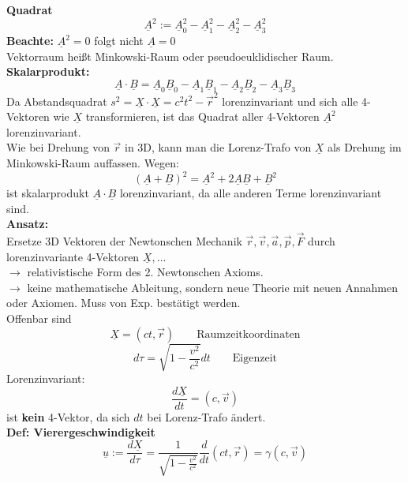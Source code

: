 \documentclass[titlepage,12pt,a4paper,ngerman]{report}
\newcommand{\tx}[1]{\textrm{#1}}
\begin{document}
\textbf{Quadrat}
$$\underline{A}^2 := \underline{A}_0^2 - \underline{A}_1^2 - \underline{A}_2^2 - \underline{A}_3^2$$
\textbf{Beachte:} $ \underline{A}^2 = 0 $ folgt nicht $ \underline{A} = 0 $\\[5pt]
Vektorraum heißt Minkowski-Raum oder pseudoeuklidischer Raum.\\[5pt]
\textbf{Skalarprodukt:}
$$\underline{A} \cdot \underline{B} = \underline{A}_0 \underline{B}_0 - \underline{A}_1 \underline{B}_1 - \underline{A}_2 \underline{B}_2 - \underline{A}_3 \underline{B}_3$$
Da Abstandsquadrat $ s^2 = \underline{X} \cdot \underline{X} = c^2 t^2 - \vec{r}^2 $ lorenzinvariant und sich alle 4-Vektoren wie $ \underline{X} $ transformieren, ist das Quadrat aller 4-Vektoren $ \underline{A}^2 $ lorenzinvariant.\\
Wie bei Drehung von $\vec{r}$ in 3D, kann man die Lorenz-Trafo von $ \underline{X} $ als Drehung im Minkowski-Raum auffassen. Wegen:
$$(\underline{A}+\underline{B})^2 = \underline{A}^2 + 2\underline{A}\underline{B} + \underline{B}^2$$
ist skalarprodukt $ \underline{A} \cdot \underline{B} $ lorenzinvariant, da alle anderen Terme lorenzinvariant sind.\\[5pt]
\textbf{Ansatz:}\\
Ersetze 3D Vektoren der Newtonschen Mechanik $ \vec{r},\vec{v},\vec{a},\vec{p},\vec{F} $ durch lorenzinvariante 4-Vektoren $ \underline{X}, \dots $\\
$ \rightarrow $ relativistische Form des 2. Newtonschen Axioms.\\
$ \rightarrow $ keine mathematische Ableitung, sondern neue Theorie mit neuen Annahmen oder Axiomen. Muss von Exp. bestätigt werden.\\[5pt]
Offenbar sind
\begin{equation*}
\underline{X} = (ct,\vec{r}) \qquad \tx{Raumzeitkoordinaten} \tag{1}
\end{equation*}
\begin{equation*}
d\tau = \sqrt{1 - \frac{v^2}{c^2}} dt \qquad \tx{Eigenzeit} \tag{2}
\end{equation*}
Lorenzinvariant:
$$\frac{d\underline{X}}{dt} = (c,\vec{v})$$
ist \textbf{kein} 4-Vektor, da sich $ dt $ bei Lorenz-Trafo ändert.\\[5pt]
\textbf{Def: Vierergeschwindigkeit}
\begin{equation*}
\underline{u} := \frac{d\underline{X}}{d\tau} = \frac{1}{\sqrt{1-\frac{v^2}{c^2}}} \frac{d}{dt} (ct,\vec{r})  = \gamma (c, \vec{v}) \tag{3}
\end{equation*}
\end{document}
